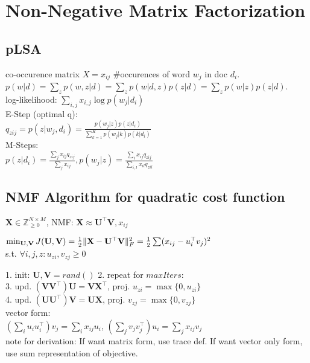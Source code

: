 \section{Non-Negative Matrix Factorization}
\subsection*{pLSA}
\textbullet co-occurence matrix $X=x_{ij}$ \#occurences of word $w_j$ in doc $d_i$. 
\textbullet $p(w|d) = \sum_z p(w,z|d) = \sum_z p(w|d,z)p(z|d) = \sum_z p(w|z)p(z|d)$.\\
\textbullet log-likelihood: $\sum_{i,j} x_{i,j}\log p(w_j|d_i)$ \\
E-Step (optimal q):\\
$q_{zij} = p(z|w_j,d_i)=\frac{p(w_j|z)p(z|d_i)}{\sum_{k=1}^K p(w_j|k)p(k|d_i)}$ \\
M-Steps:\\
$p(z|d_i) = \frac{\sum_j x_{ij}q_{zij}}{\sum_j x_{ij}}, p(w_j|z) = \frac{\sum_i x_{ij}q_{zij}}{\sum_{i,l}x_{il}q_{zil}}$\\

\subsection*{NMF Algorithm for quadratic cost function}
$\mathbf{X} \in \mathbb{Z}^{N \times M}_{\geq 0}$, NMF: $\mathbf{X} \approx \mathbf{U^\top V}, x_{ij}$

$\min_{\mathbf{U}, \mathbf{V}} J(\mathbf{U}, \mathbf{V}) = \frac{1}{2} \|\mathbf{X} - \mathbf{U}^\top\mathbf{V}\|_F^2 = \\ 
\frac{1}{2}\sum(x_{ij}-u_i^\top v_j)^2$\\
s.t. $\forall i,j,z:u_{zi},v_{zj} \geq 0 $


1. init: $\mathbf{U}, \mathbf{V} = rand()$ 2. repeat for $\mathit{maxIters}$:\\
3. upd. $(\mathbf{VV}^\top)\mathbf{U} = \mathbf{VX}^\top$, proj. $u_{zi} = \max \{ 0, u_{zi} \}$\\
4. upd. $(\mathbf{UU}^\top)\mathbf{V} = \mathbf{UX}$, proj. $v_{zj} = \max \{ 0, v_{zj} \}$ \\
\textbullet vector form: \\ 
$(\sum_i u_iu_i^\top)v_j=\sum_i x_{ij}u_i$, $(\sum_j v_jv_j^\top)u_i=\sum_j x_{ij}v_j$ \\
note for derivation: If want matrix form, use trace def. If want vector only form, use sum representation of objective.
